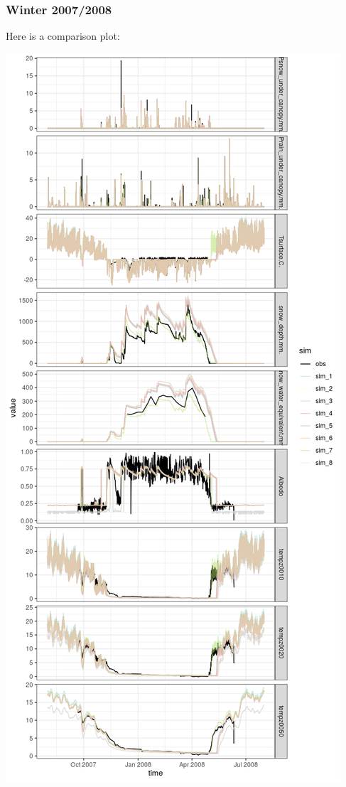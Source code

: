 \documentclass[
]{article}
\begin{document}
\hypertarget{winter-20072008}{%
\subsubsection{Winter 2007/2008}\label{winter-20072008}}

Here is a comparison plot:

\includegraphics{coldelaporte_v6_files/figure-latex/Winter_2007_2009-1.png}
\end{document}
